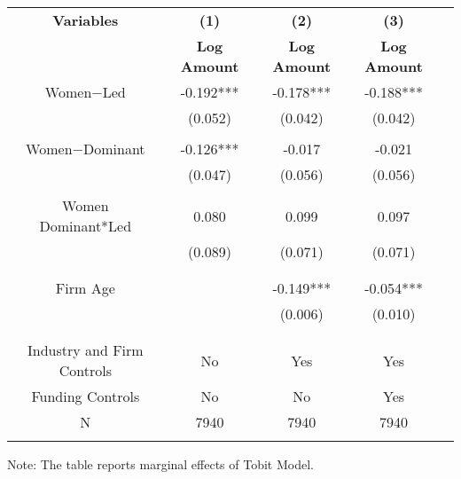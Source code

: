  \begin{table}[htbp]
    \begin{tabular}{c c c c c}
    \toprule
    \textbf{Variables} & \textbf{(1)} & \textbf{(2)} & \textbf{(3)}               \\ 
    \textbf & \textbf{Log Amount} & \textbf{Log Amount} & \textbf{Log Amount}  \\ 

    \midrule
    Women$-$Led         &   -0.192*** &      -0.178***  &        -0.188***   \\
                        &    (0.052)  &      (0.042)   &         (0.042)  \\
                        &             &                &                  \\
    Women$-$Dominant    &    -0.126*** &      -0.017    &        -0.021  \\
                        &    (0.047)  &      (0.056)   &         (0.056)  \\
                        &             &                &                    \\
    Women Dominant*Led      &    0.080     &      0.099  &        0.097   \\
                        &   (0.089)   &      (0.071)   &      (0.071)  \\                    
                        &             &                &             \\
                        &             &                &                    \\
    Firm Age            &             &      -0.149*** &    -0.054***        \\
                        &             &      (0.006)   &    (0.010)       \\
                        &             &                &                 \\
                        &             &                &                \\
Industry and Firm Controls   &   No        &   Yes       &        Yes    \\
    Funding Controls    &   No             &   No        &         Yes        \\

    \midrule
     N                  &   7940          &      7940  &     7940        \\          
    \bottomrule
    \addlinespace[1ex]
    \multicolumn{3}{l}{\textsuperscript{***}$p<0.01$, 
      \textsuperscript{**}$p<0.05$, 
      \textsuperscript{*}$p<0.1$}
    \end{tabular}
    Note: The table reports marginal effects of Tobit Model.
\end{table}
